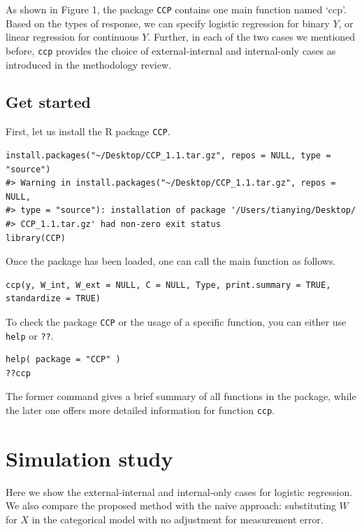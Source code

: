 \documentclass[15 pt,]{article}
\begin{document}
As shown in Figure 1, the package \texttt{CCP} contains one main
function named `ccp'. Based on the types of response, we can specify
logistic regression for binary \(Y\), or linear regression for
continuous \(Y\). Further, in each of the two cases we mentioned before,
\texttt{ccp} provides the choice of external-internal and internal-only
cases as introduced in the methodology review.

\subsection{Get started}\label{get-started}

First, let us install the R package \texttt{CCP}.

\begin{verbatim}
install.packages("~/Desktop/CCP_1.1.tar.gz", repos = NULL, type = "source")
#> Warning in install.packages("~/Desktop/CCP_1.1.tar.gz", repos = NULL,
#> type = "source"): installation of package '/Users/tianying/Desktop/
#> CCP_1.1.tar.gz' had non-zero exit status
library(CCP)
\end{verbatim}

Once the package has been loaded, one can call the main function as
follows.

\begin{verbatim}
ccp(y, W_int, W_ext = NULL, C = NULL, Type, print.summary = TRUE, standardize = TRUE)
\end{verbatim}

To check the package \texttt{CCP} or the usage of a specific function,
you can either use \texttt{help} or \texttt{??}.

\begin{verbatim}
help( package = "CCP" )
??ccp
\end{verbatim}

The former command gives a brief summary of all functions in the
package, while the later one offers more detailed information for
function \texttt{ccp}.

\section{Simulation study}\label{simulation-study}

Here we show the external-internal and internal-only cases for logistic
regression. We also compare the proposed method with the naive approach:
substituting \(W\) for \(X\) in the categorical model with no adjustment
for measurement error.
\end{document}
